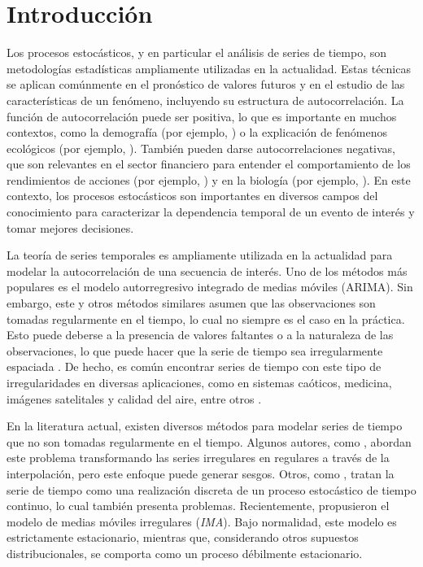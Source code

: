 \chapter{Introducci\'{o}n}


Los procesos estocásticos, y en particular el análisis de series de tiempo,
son metodologías estadísticas ampliamente utilizadas en la actualidad. 
Estas técnicas se aplican comúnmente en el pronóstico de valores futuros
y en el estudio de las características de un fenómeno, incluyendo su 
estructura de autocorrelación. La función de autocorrelación puede ser 
positiva, lo que es importante en muchos contextos, como la demografía 
(por ejemplo, \cite{novoseltseva2019spatial}) o la explicación de fenómenos 
ecológicos (por ejemplo, \cite{yang2019predictability}). También pueden darse 
autocorrelaciones negativas, que son relevantes en el sector 
financiero para entender el comportamiento de los rendimientos de 
acciones (por ejemplo, \cite{kuttu2017feedback}) y en la biología 
(por ejemplo, \cite{rindorf2020periodic}). En este contexto, los procesos 
estocásticos son importantes en diversos campos del conocimiento para 
caracterizar la dependencia temporal de un evento de interés y tomar 
mejores decisiones.


La teoría de series temporales es ampliamente utilizada en la actualidad
para modelar la autocorrelación de una secuencia de interés. Uno de 
los métodos más populares es el modelo autorregresivo integrado de 
medias móviles (ARIMA). Sin embargo, este y otros métodos similares 
asumen que las observaciones son tomadas regularmente en el tiempo, 
lo cual no siempre es el caso en la práctica. Esto puede deberse a la 
presencia de valores faltantes o a la naturaleza de las observaciones, 
lo que puede hacer que la serie de tiempo sea irregularmente espaciada 
\citep{elorrieta2019discrete}. De hecho, es común encontrar series de 
tiempo con este tipo de irregularidades en diversas aplicaciones, como
en sistemas caóticos, medicina, imágenes satelitales y calidad del 
aire, entre otros \citep{shamsan2020intrinsic, liu2019comparison, 
ghaderpour2020change, dilmaghani2007harmonic}.



En la literatura actual, existen diversos métodos para modelar series de 
tiempo que no son tomadas regularmente en el tiempo. Algunos autores, 
como \cite{adorf1995interpolation}, abordan este problema transformando 
las series irregulares en regulares a través de la interpolación, pero 
este enfoque puede generar sesgos. Otros, como \cite{robinson1977estimation},
tratan la serie de tiempo como una realización discreta de un proceso 
estocástico de tiempo continuo, lo cual también presenta problemas. 
Recientemente,  \cite{ojedaIMA} propusieron el modelo de medias móviles irregulares 
(\emph{IMA}). Bajo normalidad, este modelo es estrictamente estacionario, 
mientras que, considerando otros supuestos distribucionales, se comporta como un proceso débilmente estacionario. 


